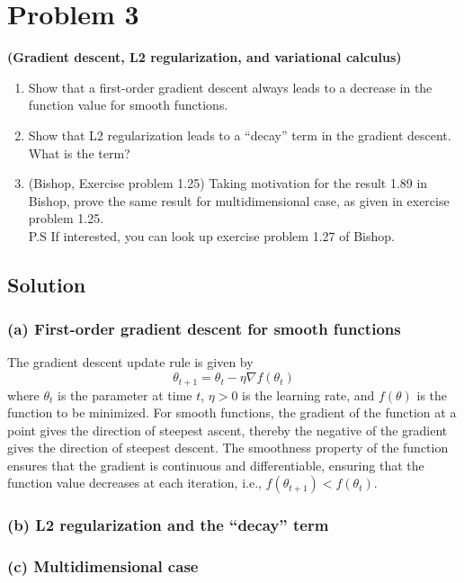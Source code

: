 \section*{Problem 3}

\textbf{(Gradient descent, L2 regularization, and variational calculus)}
\begin{enumerate}[label= (\alph*), noitemsep, topsep=0pt]
      \item Show that a first-order gradient descent always leads to a decrease in the function value for smooth functions.

      \item Show that L2 regularization leads to a ``decay'' term in the gradient descent.
            What is the term?

      \item (Bishop, Exercise problem 1.25) Taking motivation for the result 1.89 in Bishop, prove the same result for multidimensional case, as given in exercise problem 1.25.\\
            P.S If interested, you can look up exercise problem 1.27 of Bishop.
\end{enumerate}

\subsection*{Solution}

\subsubsection*{(a) First-order gradient descent for smooth functions}

The gradient descent update rule is given by
\begin{equation*}
      \theta_{t+1} = \theta_t - \eta \nabla f(\theta_t)
\end{equation*}
where \(\theta_t\) is the parameter at time \(t\), \( \eta > 0 \) is the learning rate, and \(f(\theta)\) is the function to be minimized.
For smooth functions, the gradient of the function at a point gives the direction of steepest ascent, thereby the negative of the gradient gives the direction of steepest descent.
The smoothness property of the function ensures that the gradient is continuous and differentiable, ensuring that the function value decreases at each iteration, i.e., \(f(\theta_{t+1}) < f(\theta_t)\).

\subsubsection*{(b) L2 regularization and the ``decay'' term}

\subsubsection*{(c) Multidimensional case}
